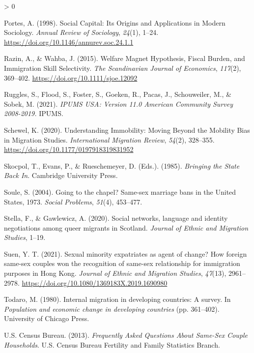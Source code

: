 \documentclass[
  11pt,
]{article}
\newlength{\cslhangindent}
\newenvironment{CSLReferences}[2] %
 {%
  \setlength{\parindent}{0pt}
  \ifodd #1 \everypar{\setlength{\hangindent}{\cslhangindent}}\ignorespaces\fi
  \ifnum #2 > 0
  \setlength{\parskip}{#2\baselineskip}
  \fi
 }%
 {}
\begin{document}
\begin{CSLReferences}{1}{0}
\leavevmode\hypertarget{ref-portes_1998}{}%
Portes, A. (1998). Social {Capital}: {Its Origins} and {Applications} in {Modern Sociology}. \emph{Annual Review of Sociology}, \emph{24}(1), 1--24. \url{https://doi.org/10.1146/annurev.soc.24.1.1}

\leavevmode\hypertarget{ref-razin_2015}{}%
Razin, A., \& Wahba, J. (2015). Welfare {Magnet Hypothesis}, {Fiscal Burden}, and {Immigration Skill Selectivity}. \emph{The Scandinavian Journal of Economics}, \emph{117}(2), 369--402. \url{https://doi.org/10.1111/sjoe.12092}

\leavevmode\hypertarget{ref-ruggles_2021}{}%
Ruggles, S., Flood, S., Foster, S., Goeken, R., Pacas, J., Schouweiler, M., \& Sobek, M. (2021). \emph{{IPUMS USA}: {Version} 11.0 {American Community Survey} 2008-2019.} {IPUMS}.

\leavevmode\hypertarget{ref-schewel_2020}{}%
Schewel, K. (2020). Understanding {Immobility}: {Moving Beyond} the {Mobility Bias} in {Migration Studies}. \emph{International Migration Review}, \emph{54}(2), 328--355. \url{https://doi.org/10.1177/0197918319831952}

\leavevmode\hypertarget{ref-skocpol_1985}{}%
Skocpol, T., Evans, P., \& Rueschemeyer, D. (Eds.). (1985). \emph{Bringing the {State Back In}}. {Cambridge University Press}.

\leavevmode\hypertarget{ref-soule_2004}{}%
Soule, S. (2004). Going to the chapel? {Same}-sex marriage bans in the {United States}, 1973{}. \emph{Social Problems}, \emph{51}(4), 453--477.

\leavevmode\hypertarget{ref-stella_2020}{}%
Stella, F., \& Gawlewicz, A. (2020). Social networks, language and identity negotiations among queer migrants in {Scotland}. \emph{Journal of Ethnic and Migration Studies}, 1--19.

\leavevmode\hypertarget{ref-suen_2021_sexual}{}%
Suen, Y. T. (2021). Sexual minority expatriates as agent of change? {How} foreign same-sex couples won the recognition of same-sex relationship for immigration purposes in {Hong Kong}. \emph{Journal of Ethnic and Migration Studies}, \emph{47}(13), 2961--2978. \url{https://doi.org/10.1080/1369183X.2019.1690980}

\leavevmode\hypertarget{ref-todaro_1980}{}%
Todaro, M. (1980). Internal migration in developing countries: A survey. In \emph{Population and economic change in developing countries} (pp. 361--402). {University of Chicago Press}.

\leavevmode\hypertarget{ref-u.s.censusbureau_2013}{}%
U.S. Census Bureau. (2013). \emph{Frequently {Asked Questions About Same}-{Sex Couple Households}}. {U.S. Census Bureau Fertility and Family Statistics Branch}.


\end{CSLReferences}
\end{document}
